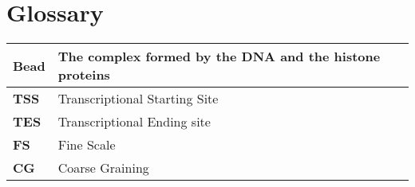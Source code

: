 \section{Glossary} \label{chap: term explanation}

\begin{table}[H]
\begin{tabular}{|l|l|}
\hline
\textbf{Bead} & The complex formed by the DNA and the histone proteins \\
\hline
\textbf{TSS} & Transcriptional Starting Site \\
\hline
\textbf{TES} & Transcriptional Ending site \\
\hline
\textbf{FS} & Fine Scale \\
\hline
\textbf{CG} & Coarse Graining \\
\hline
\end{tabular}
\end{table}